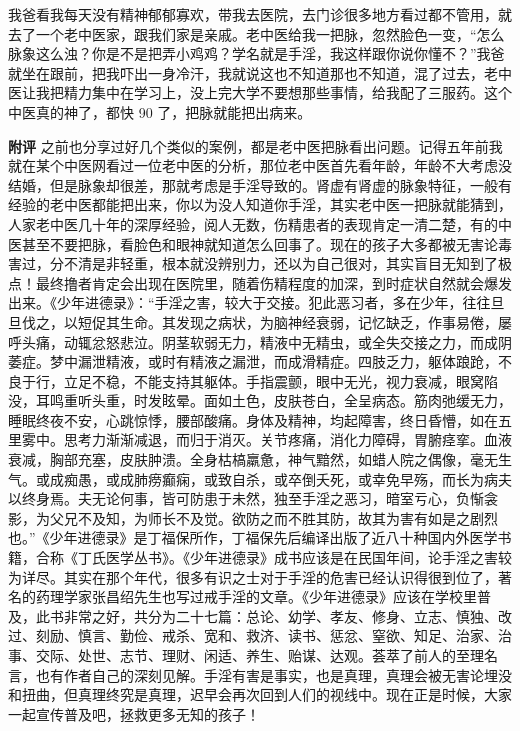 \begin{case}
    我爸看我每天没有精神郁郁寡欢，带我去医院，去门诊很多地方看过都不管用，就去了一个老中医家，跟我们家是亲戚。老中医给我一把脉，忽然脸色一变，“怎么脉象这么浊？你是不是把弄小鸡鸡？学名就是手淫，我这样跟你说你懂不？”我爸就坐在跟前，把我吓出一身冷汗，我就说这也不知道那也不知道，混了过去，老中医让我把精力集中在学习上，没上完大学不要想那些事情，给我配了三服药。这个中医真的神了，都快 90 了，把脉就能把出病来。

    \textbf{附评} 之前也分享过好几个类似的案例，都是老中医把脉看出问题。记得五年前我就在某个中医网看过一位老中医的分析，那位老中医首先看年龄，年龄不大考虑没结婚，但是脉象却很差，那就考虑是手淫导致的。肾虚有肾虚的脉象特征，一般有经验的老中医都能把出来，你以为没人知道你手淫，其实老中医一把脉就能猜到，人家老中医几十年的深厚经验，阅人无数，伤精患者的表现肯定一清二楚，有的中医甚至不要把脉，看脸色和眼神就知道怎么回事了。现在的孩子大多都被无害论毒害过，分不清是非轻重，根本就没辨别力，还以为自己很对，其实盲目无知到了极点！最终撸者肯定会出现在医院里，随着伤精程度的加深，到时症状自然就会爆发出来。《少年进德录》：“手淫之害，较大于交接。犯此恶习者，多在少年，往往旦旦伐之，以短促其生命。其发现之病状，为脑神经衰弱，记忆缺乏，作事易倦，屡呼头痛，动辄忿怒悲泣。阴茎软弱无力，精液中无精虫，或全失交接之力，而成阴萎症。梦中漏泄精液，或时有精液之漏泄，而成滑精症。四肢乏力，躯体踉跄，不良于行，立足不稳，不能支持其躯体。手指震颤，眼中无光，视力衰减，眼窝陷没，耳鸣重听头重，时发眩晕。面如土色，皮肤苍白，全呈病态。筋肉弛缓无力，睡眠终夜不安，心跳惊悸，腰部酸痛。身体及精神，均起障害，终日昏懵，如在五里雾中。思考力渐渐减退，而归于消灭。关节疼痛，消化力障碍，胃腑痉挛。血液衰减，胸部充塞，皮肤肿溃。全身枯槁羸惫，神气黯然，如蜡人院之偶像，毫无生气。或成痴愚，或成肺痨癫痫，或致自杀，或卒倒夭死，或幸免早殇，而长为病夫以终身焉。夫无论何事，皆可防患于未然，独至手淫之恶习，暗室亏心，负惭衾影，为父兄不及知，为师长不及觉。欲防之而不胜其防，故其为害有如是之剧烈也。”《少年进德录》是丁福保所作，丁福保先后编译出版了近八十种国内外医学书籍，合称《丁氏医学丛书》。《少年进德录》成书应该是在民国年间，论手淫之害较为详尽。其实在那个年代，很多有识之士对于手淫的危害已经认识得很到位了，著名的药理学家张昌绍先生也写过戒手淫的文章。《少年进德录》应该在学校里普及，此书非常之好，共分为二十七篇：总论、幼学、孝友、修身、立志、慎独、改过、刻励、慎言、勤俭、戒杀、宽和、救济、读书、惩忿、窒欲、知足、治家、治事、交际、处世、志节、理财、闲适、养生、贻谋、达观。荟萃了前人的至理名言，也有作者自己的深刻见解。手淫有害是事实，也是真理，真理会被无害论埋没和扭曲，但真理终究是真理，迟早会再次回到人们的视线中。现在正是时候，大家一起宣传普及吧，拯救更多无知的孩子！
\end{case}

